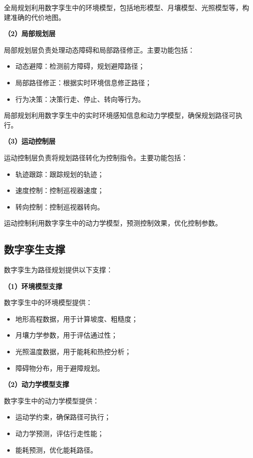 全局规划利用数字孪生中的环境模型，包括地形模型、月壤模型、光照模型等，构建准确的代价地图。

\textbf{（2）局部规划层}

局部规划层负责处理动态障碍和局部路径修正。主要功能包括：
\begin{itemize}
    \item 动态避障：检测前方障碍，规划避障路径；
    \item 局部路径修正：根据实时环境信息修正路径；
    \item 行为决策：决策行走、停止、转向等行为。
\end{itemize}

局部规划利用数字孪生中的实时环境感知信息和动力学模型，确保规划路径可执行。

\textbf{（3）运动控制层}

运动控制层负责将规划路径转化为控制指令。主要功能包括：
\begin{itemize}
    \item 轨迹跟踪：跟踪规划的轨迹；
    \item 速度控制：控制巡视器速度；
    \item 转向控制：控制巡视器转向。
\end{itemize}

运动控制利用数字孪生中的动力学模型，预测控制效果，优化控制参数。

\subsection{数字孪生支撑}
\label{subsec:dt_support}

数字孪生为路径规划提供以下支撑：

\textbf{（1）环境模型支撑}

数字孪生中的环境模型提供：
\begin{itemize}
    \item 地形高程数据，用于计算坡度、粗糙度；
    \item 月壤力学参数，用于评估通过性；
    \item 光照温度数据，用于能耗和热控分析；
    \item 障碍物分布，用于避障规划。
\end{itemize}

\textbf{（2）动力学模型支撑}

数字孪生中的动力学模型提供：
\begin{itemize}
    \item 运动学约束，确保路径可执行；
    \item 动力学预测，评估行走性能；
    \item 能耗预测，优化能耗路径。
\end{itemize}

